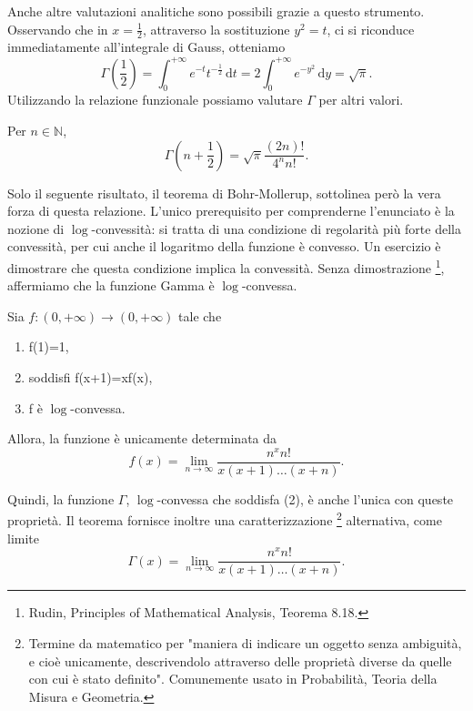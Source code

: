 Anche altre valutazioni analitiche sono possibili grazie a questo strumento. 
Osservando che in $x= \frac{1}{2}$, attraverso la sostituzione $y^2=t$, ci si riconduce immediatamente all'integrale di Gauss, otteniamo 
\begin{equation*}
	\Gamma \left( \frac{1}{2} \right)= \int_{0}^{+ \infty}e^{-t}t^{- \frac{1}{2}} \, \mathrm{d}t=2 \int_{0}^{+ \infty}e^{-y^2} \, \mathrm{d}y= \sqrt{ \pi}.
\end{equation*} 
Utilizzando la relazione funzionale possiamo valutare $ \Gamma$ per altri valori.
\begin{Res} Per $n \in \mathbb{N}$,
	\begin{equation*}
		\Gamma \left(n+ \frac{1}{2} \right) = 
		\sqrt{ \pi} \frac{(2n)!}{4^n n!}.
	\end{equation*}
\end{Res}

Solo il seguente risultato, il teorema di Bohr-Mollerup, sottolinea però la vera forza di questa relazione. 
L'unico prerequisito per comprenderne l'enunciato è la nozione di $ \log$-convessità: si tratta di una condizione di regolarità più forte della convessità, per cui anche il logaritmo della funzione è convesso. 
Un esercizio è dimostrare che questa condizione implica la convessità. 
Senza dimostrazione \footnote{Rudin, Principles of Mathematical Analysis, Teorema 8.18.}, affermiamo che la funzione Gamma è $ \log$-convessa.

\begin{The}
Sia $f:(0,+ \infty) \to(0,+ \infty)$ tale che
\begin{enumerate}
	\item f(1)=1,
	\item soddisfi f(x+1)=xf(x),
	\item f è $ \log$-convessa.
\end{enumerate}
Allora, la funzione è unicamente determinata da
\begin{equation*}
f(x) = 
\lim_{n \to \infty} \frac{n^x n!}{x(x+1) \dots(x+n)}.	
\end{equation*}
\end{The}
Quindi, la funzione $ \Gamma$, $ \log$-convessa che soddisfa (2), è anche l'unica con queste proprietà. 
Il teorema fornisce inoltre una caratterizzazione \footnote{Termine da matematico per "maniera di indicare un oggetto senza ambiguità, e cioè unicamente, descrivendolo attraverso delle proprietà diverse da quelle con cui è stato definito". 
Comunemente usato in Probabilità, Teoria della Misura e Geometria.} alternativa, come limite
\begin{equation*}
	\Gamma(x) = 
	\lim_{n \to \infty} \frac{n^x n!}{x(x+1) \dots(x+n)}.	
\end{equation*}

\pagebreak